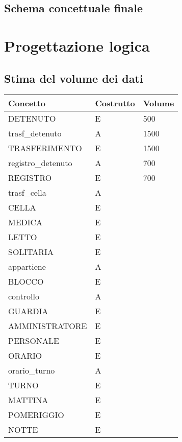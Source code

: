 \documentclass[a4paper,12pt]{report}
\begin{document}
\section{Schema concettuale finale}
\chapter{Progettazione logica}
\section{Stima del volume dei dati}
\begin{table}[]
\begin{tabular}{lll}
\hline
Concetto & Costrutto & Volume \\ \hline
DETENUTO & E & 500 \\
trasf\_detenuto & A & 1500 \\
TRASFERIMENTO & E &  1500 \\
registro\_detenuto & A & 700 \\
REGISTRO & E & 700 \\
trasf\_cella & A &  \\
CELLA & E &  \\
MEDICA & E & \\
LETTO & E & \\
SOLITARIA & E & \\
appartiene & A & \\
BLOCCO & E & \\
controllo & A & \\
GUARDIA & E & \\
AMMINISTRATORE & E & \\
PERSONALE & E & \\
ORARIO & E & \\
orario\_turno & A & \\
TURNO & E & \\
MATTINA & E & \\
POMERIGGIO & E & \\
NOTTE & E &
\end{tabular}
\end{table}
\end{document}
